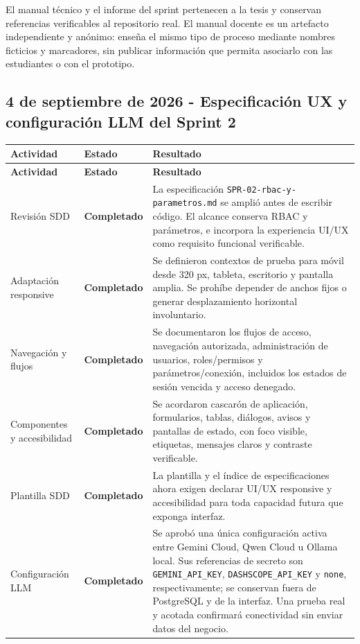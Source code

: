 \documentclass[11pt,letterpaper]{article}
\newcommand{\statusok}{\textcolor{deepgreen}{\textbf{Completado}}}
\newcommand{\file}[1]{\texttt{#1}}
\begin{document}
El manual técnico y el informe del sprint pertenecen a la tesis y conservan referencias verificables al repositorio real. El manual docente es un artefacto independiente y anónimo: enseña el mismo tipo de proceso mediante nombres ficticios y marcadores, sin publicar información que permita asociarlo con las estudiantes o con el prototipo.

\clearpage
\subsection{4 de septiembre de 2026 - Especificación UX y configuración LLM del Sprint 2}

\begin{longtable}{@{}p{}p{}p{}@{}}
  \toprule
  \textbf{Actividad} & \textbf{Estado} & \textbf{Resultado} \\
  \midrule
  \endfirsthead
  \toprule
  \textbf{Actividad} & \textbf{Estado} & \textbf{Resultado} \\
  \midrule
  \endhead
  Revisión SDD & \statusok & La especificación \file{SPR-02-rbac-y-parametros.md} se amplió antes de escribir código. El alcance conserva RBAC y parámetros, e incorpora la experiencia UI/UX como requisito funcional verificable. \\
  Adaptación responsive & \statusok & Se definieron contextos de prueba para móvil desde 320 px, tableta, escritorio y pantalla amplia. Se prohíbe depender de anchos fijos o generar desplazamiento horizontal involuntario. \\
  Navegación y flujos & \statusok & Se documentaron los flujos de acceso, navegación autorizada, administración de usuarios, roles/permisos y parámetros/conexión, incluidos los estados de sesión vencida y acceso denegado. \\
  Componentes y accesibilidad & \statusok & Se acordaron cascarón de aplicación, formularios, tablas, diálogos, avisos y pantallas de estado, con foco visible, etiquetas, mensajes claros y contraste verificable. \\
  Plantilla SDD & \statusok & La plantilla y el índice de especificaciones ahora exigen declarar UI/UX responsive y accesibilidad para toda capacidad futura que exponga interfaz. \\
  Configuración LLM & \statusok & Se aprobó una única configuración activa entre Gemini Cloud, Qwen Cloud u Ollama local. Sus referencias de secreto son \file{GEMINI\_API\_KEY}, \file{DASHSCOPE\_API\_KEY} y \file{none}, respectivamente; se conservan fuera de PostgreSQL y de la interfaz. Una prueba real y acotada confirmará conectividad sin enviar datos del negocio. \\

\end{longtable}
\end{document}
